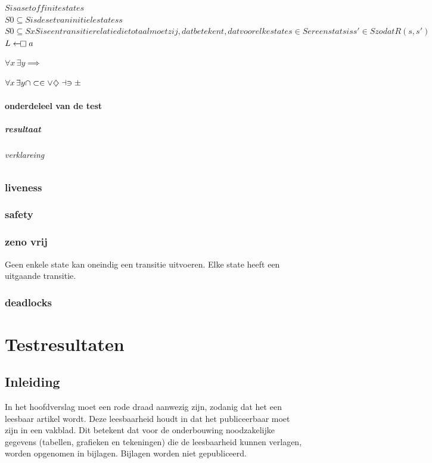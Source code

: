 $S is a set of finite states$\\
$S0 \subseteq S is de set van initiele statess$ \\
$S0 \subseteq S xS  is een transitie relatie die totaal moet zij, dat betekent, dat voor elke state s \in S er een stats is s' \in S zodat R(s,s')$
$L\gets\mathrel{\mkern-2.4mu\mathop\square} a$

$\forall x\,\exists y \implies $

$\forall x\,\exists y \cap \subset \in \vee \diamondsuit \dashv \ni \pm$


\subsubsection{onderdeleel van de test}
\paragraph{resultaat}
\subparagraph{verklareing}


\subsection{liveness}


\subsection{safety}


\subsection{zeno vrij}
Geen enkele state kan oneindig een transitie uitvoeren. Elke state heeft een uitgaande transitie.

\subsection{deadlocks}




 




	\chapter{Testresultaten}
	
	\section{Inleiding}
	In het hoofdverslag moet een rode draad aanwezig zijn,
	zodanig dat het een leesbaar artikel wordt. Deze leesbaarheid houdt in
	dat het publiceerbaar moet zijn in een vakblad. Dit betekent dat voor
	de onderbouwing noodzakelijke gegevens (tabellen, grafieken en
	tekeningen) die de leesbaarheid kunnen verlagen, worden opgenomen in
	bijlagen. Bijlagen worden niet gepubliceerd.
	
